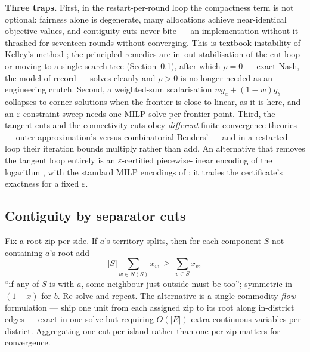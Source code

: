 \documentclass[11pt]{article}
\theoremstyle{remark}\newtheorem*{remark}{Remark}
\begin{document}
\begin{warnbox}
\textbf{Three traps.} First, in the restart-per-round loop the compactness term is not
optional: fairness alone is degenerate, many allocations achieve near-identical
objective values, and contiguity cuts never bite --- an implementation without it
thrashed for seventeen rounds without converging. This is textbook instability of
Kelley's method \citep{lemarechal1995}; the principled remedies are in--out
stabilisation of the cut loop \citep{benameur2007,fischettisalvagnin2010} or moving to
a single search tree (Section~\ref{sec:cuts}), after which $\rho=0$ --- exact Nash, the
model of record --- solves cleanly and $\rho>0$ is no longer needed as an engineering
crutch. Second, a weighted-sum scalarisation $wg_a+(1-w)g_b$ collapses to corner
solutions when the frontier is close to linear, as it is here, and an
$\varepsilon$-constraint sweep needs one MILP solve per frontier point. Third, the
tangent cuts and the connectivity cuts obey \emph{different} finite-convergence
theories --- outer approximation's \citep{duran1986,fletcher1994} versus combinatorial
Benders' \citep{hooker2003,codato2006} --- and in a restarted loop their iteration
bounds multiply rather than add. An alternative that removes the tangent loop entirely
is an $\varepsilon$-certified piecewise-linear encoding of the logarithm
\citep[\S6]{caragiannis2019}, with the standard MILP encodings of
\citet{vielma2011}; it trades the certificate's exactness for a fixed $\varepsilon$.
\end{warnbox}

\subsection{Contiguity by separator cuts}\label{sec:cuts}
Fix a root zip per side. If $a$'s territory splits, then for each component $S$ not
containing $a$'s root add
\begin{equation}\label{eq:cut}
|S|\sum_{w\in N(S)}x_w\ \ge\ \sum_{v\in S}x_v ,
\end{equation}
``if any of $S$ is with $a$, some neighbour just outside must be too''; symmetric in
$(1-x)$ for $b$. Re-solve and repeat. The alternative is a single-commodity \emph{flow}
formulation --- ship one unit from each assigned zip to its root along in-district
edges \citep{shirabe2005} --- exact in one solve but requiring $O(|E|)$ extra continuous
variables per district. Aggregating one cut per island rather than one per zip matters
for convergence.
\end{document}
